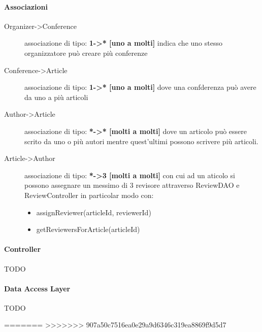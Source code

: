 \paragraph{Associazioni}
\begin{description}
\item [Organizer->Conference] associazione di tipo: \textbf{1->* [uno a molti]} indica che uno stesso organizzatore può creare più conferenze
\item [Conference->Article] associazione di tipo: \textbf{1->* [uno a molti]} dove una confderenza può avere da uno a più articoli
\item [Author->Article] associazione di tipo: \textbf{*->* [molti a molti]} dove un articolo può essere scrito da uno o più autori mentre quest'ultimi possono scrivere più articoli.
\item [Article->Author] associazione di tipo: \textbf{*->3 [molti a molti]} con cui ad un aticolo si possono assegnare un messimo di 3 revisore attraverso ReviewDAO e ReviewController in particolar modo con:
\begin{itemize}
 \item assignReviewer(articleId, reviewerId)
\item getReviewersForArticle(articleId)
\end{itemize}
\end{description}

\paragraph{Controller}
\begin{description}
\item[TODO]
\end{description}

\paragraph{Data Access Layer}
\begin{description}
\item[TODO]
\end{description}

=======
>>>>>>> 907a50c7516ea0e29a9d6346c319ea8869f9d5d7
